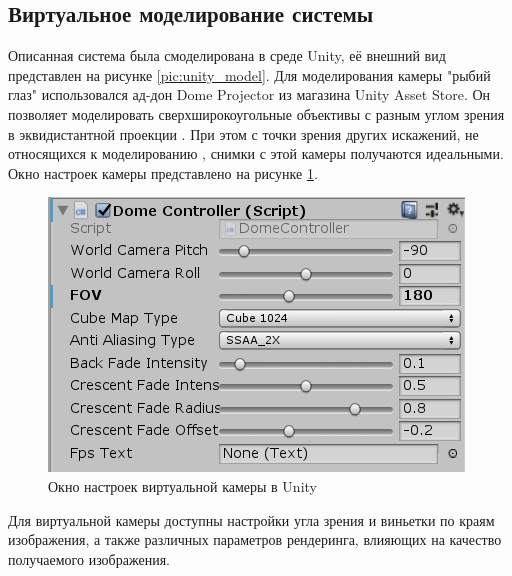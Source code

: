 \subsection{Виртуальное моделирование системы}

Описанная система была смоделирована в среде Unity, её внешний вид представлен на рисунке \ref{pic:unity_model}. Для 
моделирования камеры "рыбий глаз" использовался ад-дон Dome Projector из магазина Unity Asset Store.    %
Он позволяет моделировать сверхширокоугольные объективы с разным углом зрения в эквидистантной проекции \cite{}. %
При этом с точки зрения других искажений, не относящихся к моделированию , снимки с этой камеры получаются идеальными. %
Окно настроек камеры представлено на рисунке \ref{pic:camera_settings}.
\begin{figure}[H]
    \begin{center}
        \includegraphics[scale=0.5]{pics/camera_settings.png}                                                                                            %
        \caption{Окно настроек виртуальной камеры в Unity}
        \label{pic:camera_settings}
    \end{center}
\end{figure}
Для виртуальной камеры доступны настройки угла зрения и виньетки по краям изображения,  %
а также различных параметров рендеринга, влияющих на качество получаемого изображения. 